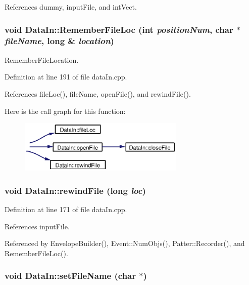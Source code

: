 References dummy, input\-File, and int\-Vect.
\subsubsection{\setlength{\rightskip}{0pt plus 5cm}void Data\-In::Remember\-File\-Loc (int {\em position\-Num}, char $\ast$ {\em file\-Name}, long \& {\em location})}\label{classDataIn_a22}


Remember\-File\-Location. 

Definition at line 191 of file data\-In.cpp.

References file\-Loc(), file\-Name, open\-File(), and rewind\-File().

Here is the call graph for this function:\begin{figure}[H]
\begin{center}
\leavevmode
\includegraphics[width=225pt]{classDataIn_a22_cgraph}
\end{center}
\end{figure}
\subsubsection{\setlength{\rightskip}{0pt plus 5cm}void Data\-In::rewind\-File (long {\em loc})}\label{classDataIn_a20}




Definition at line 171 of file data\-In.cpp.

References input\-File.

Referenced by Envelope\-Builder(), Event::Num\-Objs(), Patter::Recorder(), and Remember\-File\-Loc().
\subsubsection{\setlength{\rightskip}{0pt plus 5cm}void Data\-In::set\-File\-Name (char $\ast$)\hspace{0.3cm}{\tt  [private]}}\label{classDataIn_d0}




